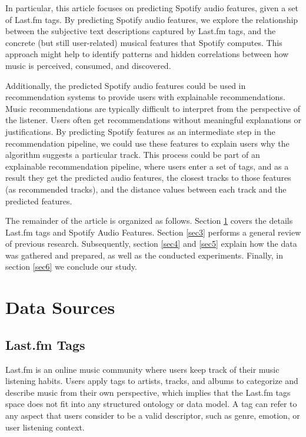 \documentclass[sn-mathphys]{sn-jnl}%
\theoremstyle{thmstyleone}%
\theoremstyle{thmstyletwo}%
\theoremstyle{thmstylethree}%
\begin{document}
In particular, this article focuses on predicting Spotify audio features, given a set of Last.fm tags.
By predicting Spotify audio features, we explore the relationship between the subjective text descriptions captured by Last.fm tags, and the concrete (but still user-related) musical features that Spotify computes.
This approach might help to identify patterns and hidden correlations between how music is perceived, consumed, and discovered.

Additionally, the predicted Spotify audio features could be used in recommendation systems to provide users with explainable recommendations.
Music recommendations are typically difficult to interpret from the perspective of the listener.
Users often get recommendations without meaningful explanations or justifications.
By predicting Spotify features as an intermediate step in the recommendation pipeline, we could use these features to explain users why the algorithm suggests a particular track.
This process could be part of an explainable recommendation pipeline, where users enter a set of tags,
and as a result they get the predicted audio features, the closest tracks to those features (as recommended tracks), and the distance values between each track and the predicted features.

The remainder of the article is organized as follows.
Section \ref{sec2} covers the details Last.fm tags and Spotify Audio Features.
Section \ref{sec3} performs a general review of previous research.
Subsequently, section \ref{sec4} and \ref{sec5} explain how the data was gathered and prepared, as well as the conducted experiments.
Finally, in section \ref{sec6} we conclude our study.

\section{Data Sources}\label{sec2}

\subsection{Last.fm Tags}

Last.fm is an online music community where users keep track of their music listening habits.
Users apply tags to artists, tracks, and albums to categorize and describe music from their own perspective, which
implies that the Last.fm tags space does not fit into any structured ontology or data model.
A tag can refer to any aspect that users consider to be a valid descriptor, such as genre,
emotion, or user listening context.
\end{document}
